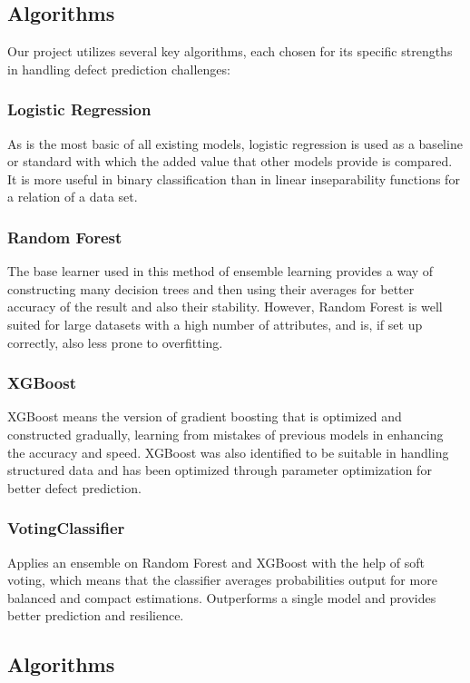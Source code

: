 \documentclass[conference]{IEEEtran}
\begin{document}
\subsection{Algorithms}

Our project utilizes several key algorithms, each chosen for its specific strengths in handling defect prediction challenges: 

\subsubsection{Logistic Regression}
As is the most basic of all existing models, logistic regression is used as a baseline or standard with which the added value that other models provide is compared. It is more useful in binary classification than in linear inseparability functions for a relation of a data set.

\subsubsection{Random Forest}
The base learner used in this method of ensemble learning provides a way of constructing many decision trees and then using their averages for better accuracy of the result and also their stability. However, Random Forest is well suited for large datasets with a high number of attributes, and is, if set up correctly, also less prone to overfitting.

\subsubsection{XGBoost}
XGBoost means the version of gradient boosting that is optimized and constructed gradually, learning from mistakes of previous models in enhancing the accuracy and speed. XGBoost was also identified to be suitable in handling structured data and has been optimized through parameter optimization for better defect prediction.
 
\subsubsection{VotingClassifier}
Applies an ensemble on Random Forest and XGBoost with the help of soft voting, which means that the classifier averages probabilities output for more balanced and compact estimations. Outperforms a single model and provides better prediction and resilience.

\subsection{Algorithms}
\end{document}
